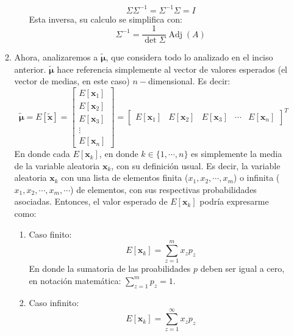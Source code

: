 \begin{problema}
\begin{enumerate}
\begin{sol}
\begin{enumerate}
\begin{itemize}
                $$\Sigma \Sigma^{-1}= \Sigma^{-1}\Sigma= I$$
                Esta inversa, su calculo se simplifica con:
                $$\Sigma^{-1}=\frac{1}{\det \Sigma}\operatorname{Adj}(A)$$
            \end{itemize}      
        \item Ahora, analizaremos a $\tilde{\boldsymbol{\mu}}$, que considera todo lo analizado en el inciso anterior. $\tilde{\boldsymbol{\mu}}$ hace referencia simplemente al vector de valores esperados (el vector de medias, en este caso) $n-$dimensional. Es decir: 
        $$\tilde{\boldsymbol{\mu}}=E[\tilde{\boldsymbol{x}}]=\begin{bmatrix}
            E[\boldsymbol{x}_1]\\
            E[\boldsymbol{x}_2]\\
            E[\boldsymbol{x}_3]\\
            \vdots \\
            E[\boldsymbol{x}_n]
        \end{bmatrix}= \begin{bmatrix}
            E[\boldsymbol{x}_1] &
            E[\boldsymbol{x}_2]&
            E[\boldsymbol{x}_3]&
            \cdots &
            E[\boldsymbol{x}_n]
        \end{bmatrix}^T$$
        En donde cada $E[\boldsymbol{x}_k]$, en donde $k\in \{1,\cdots, n\}$ es simplemente la media de la variable aleatoria $\boldsymbol{x}_k$, con su definición usual. Es decir, la variable aleatoria $\boldsymbol{x}_k$ con una lista de elementos finita ($x_1,x_2,\cdots, x_m$) o infinita ($x_1,x_2,\cdots, x_m, \cdots $) de elementos, con sus respectivas probabilidades asociadas. Entonces, el valor esperado de $E[\boldsymbol{x}_k]$ podría expresarme como: 
        \begin{enumerate}
            \item Caso finito: 
            $$E[\boldsymbol{x}_k]=\sum_{z=1}^m x_z p_z$$
            En donde la sumatoria de las proabilidades $p$ deben ser igual a cero, en notación matemática: $\sum_{z=1}^{m}p_z=1$.
            \item Caso infinito: 
            $$E[\boldsymbol{x}_k]=\sum_{z=1}^\infty x_z p_z$$
        \end{enumerate}



\end{enumerate}
\end{sol}
\end{enumerate}
\end{problema}
